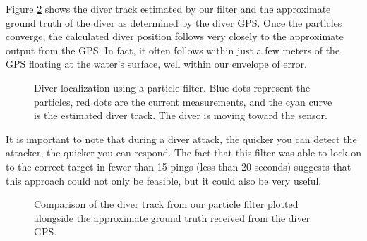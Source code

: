 \documentclass{article} %
\begin{document}
Figure \ref{fig:track_vs_diver_gps} shows the diver track estimated by our filter and the approximate ground truth of the diver as determined by the diver GPS. Once the particles converge, the calculated diver position follows very closely to the approximate output from the GPS. In fact, it often follows within just a few meters of the GPS floating at the water's surface, well within our envelope of error.

\begin{figure}[htbp]
  \centering
  \caption{Diver localization using a particle filter. Blue dots represent
    the particles, red dots are the current measurements, and the cyan curve is
    the estimated diver track. The diver is moving toward the sensor.}
  \label{fig:particle_532}
\end{figure}

It is important to note that during a diver attack, the quicker you can detect the attacker, the quicker you can respond. The fact that this filter was able to lock on to the correct target in fewer than 15 pings (less than 20 seconds) suggests that this approach could not only be feasible, but it could also be very useful.

\begin{figure}[htbp]
  \centering
  \caption{Comparison of the diver track from our particle filter plotted
    alongside the approximate ground truth received from the diver GPS.}
  \label{fig:track_vs_diver_gps}
\end{figure}
\end{document}
